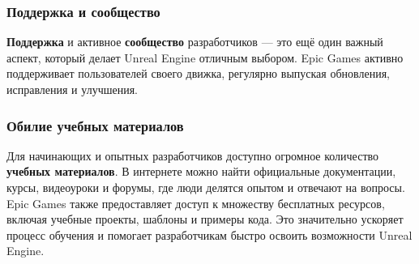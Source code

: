 \subsubsection{Поддержка и сообщество}
\textbf{Поддержка} и активное \textbf{сообщество} разработчиков — это ещё один важный аспект, который делает Unreal Engine отличным выбором. Epic Games активно поддерживает пользователей своего движка, регулярно выпуская обновления, исправления и улучшения.

\subsubsection{Обилие учебных материалов}
Для начинающих и опытных разработчиков доступно огромное количество \textbf{учебных материалов}. В интернете можно найти официальные документации, курсы, видеоуроки и форумы, где люди делятся опытом и отвечают на вопросы. Epic Games также предоставляет доступ к множеству бесплатных ресурсов, включая учебные проекты, шаблоны и примеры кода. Это значительно ускоряет процесс обучения и помогает разработчикам быстро освоить возможности Unreal Engine.
